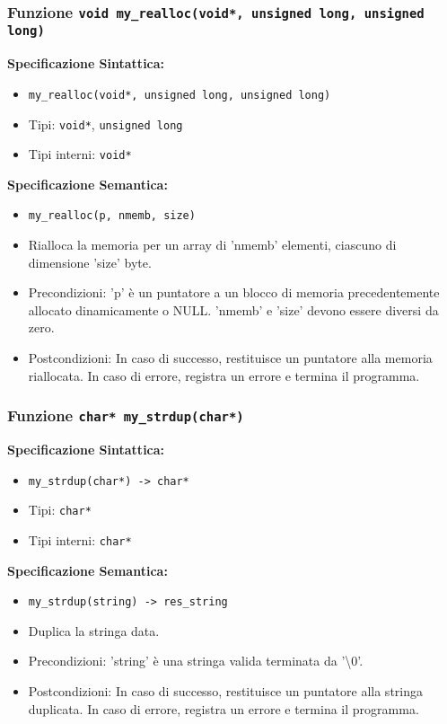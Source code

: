 \documentclass[11pt]{scrartcl} %
\begin{document}
\subsubsection{Funzione \texttt{void my\_realloc(void*, unsigned long, unsigned long)}}

\textbf{Specificazione Sintattica:}
\begin{itemize}
	\item \texttt{my\_realloc(void*, unsigned long, unsigned long)}
	\item Tipi: \texttt{void*}, \texttt{unsigned long}
	\item Tipi interni: \texttt{void*}
\end{itemize}

\textbf{Specificazione Semantica:}
\begin{itemize}
	\item \texttt{my\_realloc(p, nmemb, size)}
	\item Rialloca la memoria per un array di 'nmemb' elementi, ciascuno di dimensione 'size' byte.
	\item Precondizioni: 'p' è un puntatore a un blocco di memoria precedentemente allocato dinamicamente o NULL. 'nmemb' e 'size' devono essere diversi da zero.
	\item Postcondizioni: In caso di successo, restituisce un puntatore alla memoria riallocata. In caso di errore, registra un errore e termina il programma.
\end{itemize}

\subsubsection{Funzione \texttt{char* my\_strdup(char*)}}

\textbf{Specificazione Sintattica:}
\begin{itemize}
	\item \texttt{my\_strdup(char*) -> char*}
	\item Tipi: \texttt{char*}
	\item Tipi interni: \texttt{char*}
\end{itemize}

\textbf{Specificazione Semantica:}
\begin{itemize}
	\item \texttt{my\_strdup(string) -> res\_string}
	\item Duplica la stringa data.
	\item Precondizioni: 'string' è una stringa valida terminata da '\textbackslash0'.
	\item Postcondizioni: In caso di successo, restituisce un puntatore alla stringa duplicata. In caso di errore, registra un errore e termina il programma.
\end{itemize}
\end{document}
